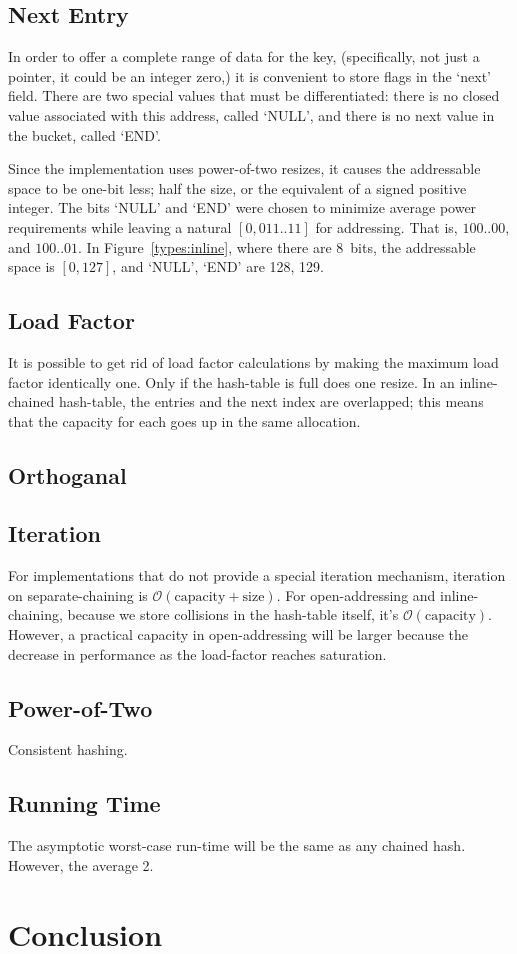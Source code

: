 \documentclass[12pt]{article}
\begin{document}
\subsection{Next Entry}

In order to offer a complete range of data for the key, (specifically, not just a pointer, it could be an integer zero,) it is convenient to store flags in the `next' field. There are two special values that must be differentiated: there is no closed value associated with this address, called `NULL', and there is no next value in the bucket, called `END'.

Since the implementation uses power-of-two resizes, it causes the addressable space to be one-bit less; half the size, or the equivalent of a signed positive integer. The bits `NULL' and `END' were chosen to minimize average power requirements while leaving a natural $[0, 011..11]$ for addressing. That is, $100..00$, and $100..01$. In Figure~\ref{types:inline}, where there are 8~bits, the addressable space is $[0, 127]$, and `NULL', `END' are 128, 129.

\subsection{Load Factor}

It is possible to get rid of load factor calculations by making the maximum load factor identically one. Only if the hash-table is full does one resize. In an inline-chained hash-table, the entries and the next index are overlapped; this means that the capacity for each goes up in the same allocation.

\subsection{Orthoganal}

\subsection{Iteration}

For implementations that do not provide a special iteration mechanism, iteration on separate-chaining is $\mathcal{O}(\text{capacity} + \text{size})$. For open-addressing and inline-chaining, because we store collisions in the hash-table itself, it's $\mathcal{O}(\text{capacity})$. However, a practical capacity in open-addressing will be larger because the decrease in performance as the load-factor reaches saturation.

\subsection{Power-of-Two}

Consistent hashing.\cite{karger1997consistent}

\subsection{Running Time}

The asymptotic worst-case run-time will be the same as any chained hash. However, the average 2.

\section{Conclusion}


\end{document}
